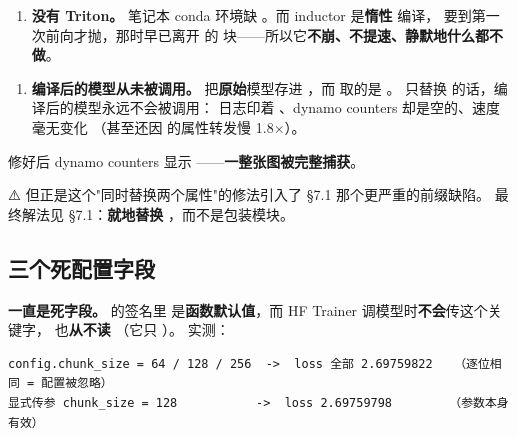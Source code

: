 \documentclass[11pt,openany]{ctexart}
\begin{document}
\begin{enumerate}
  \item \textbf{没有 Triton。} 笔记本 conda 环境缺 。而 inductor 是\textbf{惰性} 编译， 要到第一次前向才抛，那时早已离开  的  块——所以它\textbf{不崩、不提速、静默地什么都不做}。
\end{enumerate}
\begin{enumerate}
  \item \textbf{编译后的模型从未被调用。}  把\textbf{原始}模型存进 ，而  取的是 。 只替换  的话，编译后的模型永远不会被调用： 日志印着 、dynamo counters 却是空的、速度毫无变化 （甚至还因  的属性转发慢 1.8$\times$）。
\end{enumerate}

修好后 dynamo counters 显示  ——\textbf{一整张图被完整捕获}。

\begin{notebox}
⚠️ 但正是这个"同时替换两个属性"的修法引入了 §7.1 那个更严重的前缀缺陷。 最终解法见 §7.1：\textbf{就地替换 }，而不是包装模块。
\end{notebox}

\subsection{三个死配置字段}

\textbf{ 一直是死字段。}  的签名里  是\textbf{函数默认值}，而 HF Trainer 调模型时\textbf{不会}传这个关键字，  也\textbf{从不读} （它只 ）。 实测：

\begin{lstlisting}[]
config.chunk_size = 64 / 128 / 256  ->  loss 全部 2.69759822   （逐位相同 = 配置被忽略）
显式传参 chunk_size = 128           ->  loss 2.69759798        （参数本身有效）
\end{lstlisting}
\end{document}
